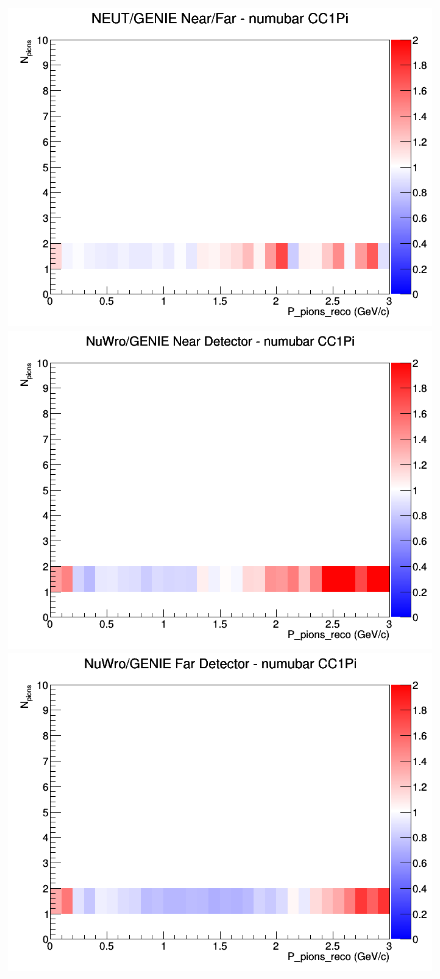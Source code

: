 \documentclass[12pt]{article}
\begin{document}
\begin{figure}[h]
\endminipage
{}
\includegraphics[width=\linewidth]{eff_N_P/FGT/pions/ratios/CC1Pi_NEUT_GENIE_numubar_NF_N_P.png}
\endminipage
\newline
{}
\includegraphics[width=\linewidth]{eff_N_P/FGT/pions/ratios/CC1Pi_NuWro_GENIE_numubar_near_N_P.png}
\endminipage
{}
\includegraphics[width=\linewidth]{eff_N_P/FGT/pions/ratios/CC1Pi_NuWro_GENIE_numubar_far_N_P.png}

\end{figure}
\end{document}
